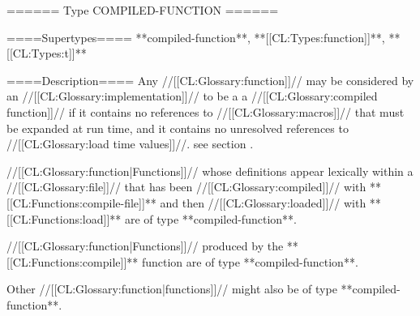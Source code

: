 ====== Type COMPILED-FUNCTION ======

====Supertypes====
**compiled-function**, **[[CL:Types:function]]**, **[[CL:Types:t]]**

====Description====
Any //[[CL:Glossary:function]]// may be considered by an //[[CL:Glossary:implementation]]// to be a a //[[CL:Glossary:compiled function]]// if it contains no references to //[[CL:Glossary:macros]]// that must be expanded at run time, and it contains no unresolved references to //[[CL:Glossary:load time values]]//. see section {\secref\CompilationSemantics}.

//[[CL:Glossary:function|Functions]]// whose definitions appear lexically within a //[[CL:Glossary:file]]// that has been //[[CL:Glossary:compiled]]// with **[[CL:Functions:compile-file]]** and then //[[CL:Glossary:loaded]]// with **[[CL:Functions:load]]** are of type **compiled-function**.

//[[CL:Glossary:function|Functions]]// produced by the **[[CL:Functions:compile]]** function are of type **compiled-function**.

Other //[[CL:Glossary:function|functions]]// might also be of type **compiled-function**.

  
